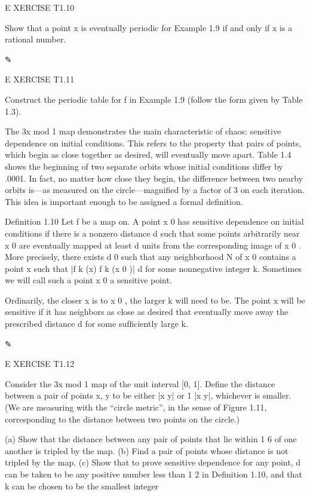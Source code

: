 \documentclass[12pt]{article}
\begin{document}
E XERCISE T1.10

Show that a point x is eventually periodic for Example 1.9 if and only if x is a rational number.

✎

E XERCISE T1.11

Construct the periodic table for f in Example 1.9 (follow the form given by Table 1.3).

The 3x mod 1 map demonstrates the main characteristic of chaos: sensitive dependence on initial 
conditions. This refers to the property that pairs of points, which begin as close together as desired, 
will eventually move apart. Table 1.4 shows the beginning of two separate orbits whose initial conditions 
differ by .0001. In fact, no matter how close they begin, the difference between two nearby orbits is—as 
measured on the circle—magniﬁed by a factor of 3 on each iteration. This idea is important enough to be 
assigned a formal deﬁnition.

Deﬁnition 1.10 Let f be a map on. A point x 0 has sensitive dependence on initial conditions if there is a 
nonzero distance d such that some points arbitrarily near x 0 are eventually mapped at least d units from 
the corresponding image of x 0 . More precisely, there exists d   0 such that any neighborhood N of x 0 
contains a point x such that |f k (x)  f k (x 0 )| 
 d for some nonnegative integer k. Sometimes we will call such a point x 0 a sensitive point.

Ordinarily, the closer x is to x 0 , the larger k will need to be. The point x will be sensitive if it has 
neighbors as close as desired that eventually move away the prescribed distance d for some sufﬁciently 
large k.

✎

E XERCISE T1.12

Consider the 3x mod 1 map of the unit interval [0, 1]. Deﬁne the distance between a pair of points x, y to 
be either |x  y| or 1  |x  y|, whichever is smaller. (We are measuring with the “circle metric”, in the 
sense of Figure 1.11, corresponding to the distance between two points on the circle.)

(a) Show that the distance between any pair of points that lie within 1  6 of one another is tripled by the 
map. (b) Find a pair of points whose distance is not tripled by the map. (c) Show that to prove sensitive 
dependence for any point, d can be taken to be any positive number less than 1  2 in Deﬁnition 1.10, and 
that k can be chosen to be the smallest integer
\end{document}
